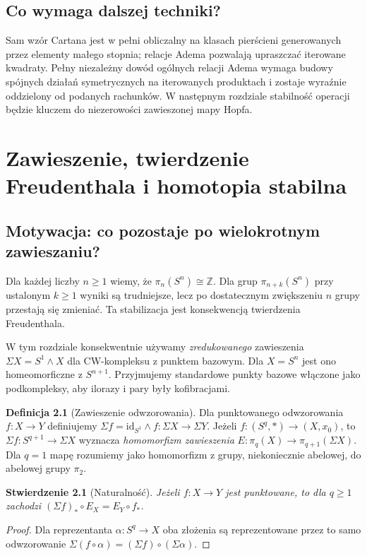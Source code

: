 \documentclass[11pt,a4paper,oneside]{report}
\newcommand{\Z}{\mathbb{Z}}
\newcommand{\id}{\mathrm{id}}
\theoremstyle{plain}
\newtheorem{stwierdzenie}[twierdzenie]{Stwierdzenie}
\theoremstyle{definition}
\newtheorem{definicja}[twierdzenie]{Definicja}
\theoremstyle{remark}
\begin{document}
\section{Co wymaga dalszej techniki?}
Sam wzór Cartana jest w pełni obliczalny na klasach
pierścieni generowanych przez elementy małego stopnia;
relacje Adema pozwalają upraszczać iterowane kwadraty.
Pełny niezależny dowód ogólnych relacji Adema wymaga
budowy spójnych działań symetrycznych na iterowanych
produktach i zostaje wyraźnie oddzielony od podanych
rachunków. W następnym rozdziale stabilność operacji
będzie kluczem do niezerowości zawieszonej mapy Hopfa.


\chapter{Zawieszenie, twierdzenie Freudenthala i homotopia stabilna}
\label{ch:stabilna-v8}

\section{Motywacja: co pozostaje po wielokrotnym zawieszaniu?}
Dla każdej liczby $n\ge1$ wiemy, że
$\pi_n(S^n)\cong\Z$. Dla grup
$\pi_{n+k}(S^n)$ przy ustalonym $k\ge1$ wyniki
są trudniejsze, lecz po dostatecznym zwiększeniu $n$
grupy przestają się zmieniać. Ta stabilizacja jest
konsekwencją twierdzenia Freudenthala.

W tym rozdziale konsekwentnie używamy \emph{zredukowanego}
zawieszenia
$\Sigma X=S^1\wedge X$ dla CW-kompleksu z punktem
bazowym. Dla $X=S^n$ jest ono homeomorficzne z $S^{n+1}$.
Przyjmujemy standardowe punkty bazowe włączone jako
podkompleksy, aby ilorazy i pary były kofibracjami.

\begin{definicja}[Zawieszenie odwzorowania]
Dla punktowanego odwzorowania $f:X\to Y$
definiujemy $\Sigma f=\id_{S^1}\wedge f:
\Sigma X\to\Sigma Y$.
Jeżeli $f:(S^q,*)\to(X,x_0)$, to
$\Sigma f:S^{q+1}\to\Sigma X$ wyznacza
\emph{homomorfizm zawieszenia}
$E:\pi_q(X)\to\pi_{q+1}(\Sigma X)$.
Dla $q=1$ mapę rozumiemy jako homomorfizm z grupy,
niekoniecznie abelowej, do abelowej grupy $\pi_2$.
\end{definicja}

\begin{stwierdzenie}[Naturalność]
Jeżeli $f:X\to Y$ jest punktowane, to dla $q\ge1$
zachodzi $(\Sigma f)_*\circ E_X=E_Y\circ f_*$.
\end{stwierdzenie}
\begin{proof}
Dla reprezentanta $\alpha:S^q\to X$ oba złożenia są
reprezentowane przez to samo odwzorowanie
$\Sigma(f\circ\alpha)=(\Sigma f)\circ(\Sigma\alpha)$.
\end{proof}
\end{document}
